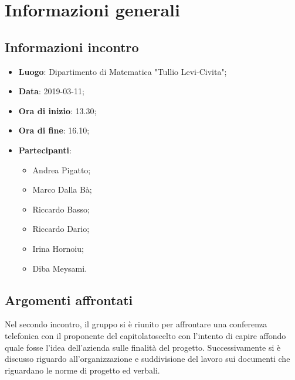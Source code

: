 \section{Informazioni generali}

\subsection{Informazioni incontro}
\begin{itemize}
	\item \textbf{Luogo}: Dipartimento di Matematica "Tullio Levi-Civita";
	\item \textbf{Data}: 2019-03-11;
	\item \textbf{Ora di inizio}: 13.30;
	\item \textbf{Ora di fine}: 16.10;
	\item \textbf{Partecipanti}: 
	\begin{itemize}
		\item Andrea Pigatto;
		\item Marco Dalla Bà;
		\item Riccardo Basso;
		\item Riccardo Dario;
		\item Irina Hornoiu;
		\item Diba Meysami.
	\end{itemize}
\end{itemize}

\subsection{Argomenti affrontati}
Nel secondo incontro, il gruppo si è riunito per affrontare una conferenza telefonica con il proponente del capitolato\glosp scelto
con l'intento di capire affondo quale fosse l'idea dell'azienda sulle finalità del progetto. 
Successivamente si è discusso riguardo all'organizzazione e suddivisione del lavoro sui documenti che riguardano le norme di progetto
ed verbali.

